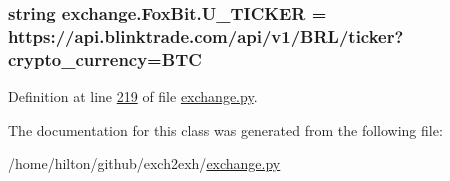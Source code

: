 \subsubsection[{\texorpdfstring{U\+\_\+\+T\+I\+C\+K\+ER}{U_TICKER}}]{\setlength{\rightskip}{0pt plus 5cm}string exchange.\+Fox\+Bit.\+U\+\_\+\+T\+I\+C\+K\+ER = \textquotesingle{}https\+://api.\+blinktrade.\+com/api/v1/B\+RL/{\bf ticker}?crypto\+\_\+currency=B\+TC\textquotesingle{}\hspace{0.3cm}{\ttfamily [static]}}\hypertarget{classexchange_1_1_fox_bit_a7ba3f64a2b55479da2239393c6140ec8}{}\label{classexchange_1_1_fox_bit_a7ba3f64a2b55479da2239393c6140ec8}


Definition at line \hyperlink{exchange_8py_source_l00219}{219} of file \hyperlink{exchange_8py_source}{exchange.\+py}.



The documentation for this class was generated from the following file\+:\begin{DoxyCompactItemize}
\item 
/home/hilton/github/exch2exh/\hyperlink{exchange_8py}{exchange.\+py}\end{DoxyCompactItemize}
